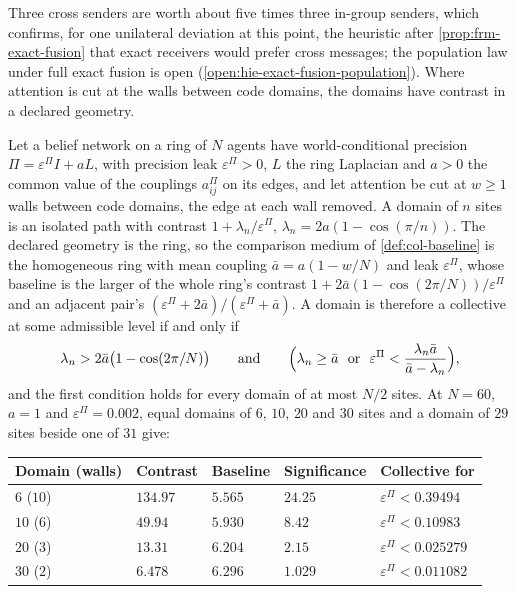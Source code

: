 Three cross senders are worth about five times three in-group senders, which confirms, for one unilateral deviation at this point, the heuristic after \cref{prop:frm-exact-fusion} that exact receivers would prefer cross messages; the population law under full exact fusion is open (\cref{open:hie-exact-fusion-population}). Where attention is cut at the walls between code domains, the domains have contrast in a declared geometry.

\begin{example}\label{ex:hie-code-domains}
Let a belief network on a ring of $N$ agents have world-conditional precision $\Pi=\varepsilon^\Pi I+aL$, with precision leak $\varepsilon^\Pi>0$, $L$ the ring Laplacian and $a>0$ the common value of the couplings $a^\Pi_{ij}$ on its edges, and let attention be cut at $w\ge1$ walls between code domains, the edge at each wall removed. A domain of $n$ sites is an isolated path with contrast $1+\lambda_n/\varepsilon^\Pi$, $\lambda_n=2a(1-\cos(\pi/n))$. The declared geometry is the ring, so the comparison medium of \cref{def:col-baseline} is the homogeneous ring with mean coupling $\bar a=a(1-w/N)$ and leak $\varepsilon^\Pi$, whose baseline is the larger of the whole ring's contrast $1+2\bar a(1-\cos(2\pi/N))/\varepsilon^\Pi$ and an adjacent pair's $(\varepsilon^\Pi+2\bar a)/(\varepsilon^\Pi+\bar a)$. A domain is therefore a collective at some admissible level if and only if
\begin{equation}\label{eq:hie-domains}
\lambda_n>2\bar a\bigl(1-\cos(2\pi/N)\bigr)\qquad\text{and}\qquad\Bigl(\lambda_n\ge\bar a\ \text{ or }\ \varepsilon^\Pi<\frac{\lambda_n\bar a}{\bar a-\lambda_n}\Bigr),
\end{equation}
and the first condition holds for every domain of at most $N/2$ sites. At $N=60$, $a=1$ and $\varepsilon^\Pi=0.002$, equal domains of $6$, $10$, $20$ and $30$ sites and a domain of $29$ sites beside one of $31$ give:
\begin{center}
\small
\begin{tabular}{@{}lllll@{}}
\toprule
Domain (walls) & Contrast & Baseline & Significance & Collective for\\
\midrule
$6$ ($10$) & $134.97$ & $5.565$ & $24.25$ & $\varepsilon^\Pi<0.39494$\\
$10$ ($6$) & $49.94$ & $5.930$ & $8.42$ & $\varepsilon^\Pi<0.10983$\\
$20$ ($3$) & $13.31$ & $6.204$ & $2.15$ & $\varepsilon^\Pi<0.025279$\\
$30$ ($2$) & $6.478$ & $6.296$ & $1.029$ & $\varepsilon^\Pi<0.011082$\\

\end{tabular}
\end{center}
\end{example}
